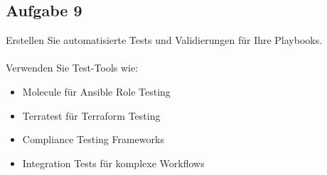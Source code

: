 \documentclass{article}
\begin{document}
    \subsection{Aufgabe 9}
    Erstellen Sie automatisierte Tests und Validierungen für Ihre Playbooks.
    \\ \\
    Verwenden Sie Test-Tools wie:
    \begin{itemize}
        \item Molecule für Ansible Role Testing
        \item Terratest für Terraform Testing
        \item Compliance Testing Frameworks
        \item Integration Tests für komplexe Workflows
    \end{itemize}
\end{document}

